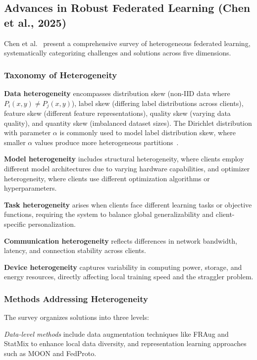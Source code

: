\documentclass[journal]{IEEEtran}
\begin{document}
\subsection{Advances in Robust Federated Learning (Chen et al., 2025)}

Chen et al.~\cite{chen2025advances} present a comprehensive survey of heterogeneous federated learning, systematically categorizing challenges and solutions across five dimensions.

\subsubsection{Taxonomy of Heterogeneity}

\textbf{Data heterogeneity} encompasses distribution skew (non-IID data where $P_i(x,y) \neq P_j(x,y)$), label skew (differing label distributions across clients), feature skew (different feature representations), quality skew (varying data quality), and quantity skew (imbalanced dataset sizes). The Dirichlet distribution with parameter $\alpha$ is commonly used to model label distribution skew, where smaller $\alpha$ values produce more heterogeneous partitions~\cite{hsu2019measuring}.

\textbf{Model heterogeneity} includes structural heterogeneity, where clients employ different model architectures due to varying hardware capabilities, and optimizer heterogeneity, where clients use different optimization algorithms or hyperparameters.

\textbf{Task heterogeneity} arises when clients face different learning tasks or objective functions, requiring the system to balance global generalizability and client-specific personalization.

\textbf{Communication heterogeneity} reflects differences in network bandwidth, latency, and connection stability across clients.

\textbf{Device heterogeneity} captures variability in computing power, storage, and energy resources, directly affecting local training speed and the straggler problem.

\subsubsection{Methods Addressing Heterogeneity}

The survey organizes solutions into three levels:

\textit{Data-level methods} include data augmentation techniques like FRAug and StatMix to enhance local data diversity, and representation learning approaches such as MOON and FedProto.
\end{document}
